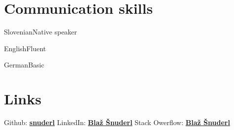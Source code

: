 \documentclass{tccv}
\begin{document}
\section{Communication skills}

\begin{factlist}
\item{Slovenian}{Native speaker}
\item{English}{Fluent}
\item{German}{Basic}
\end{factlist}

\section{Links} 
Github: \href{https://github.com/snuderl}{\textbf{snuderl}} \newline
LinkedIn:  \href{https://www.linkedin.com/pub/bla\%C5\%BE-\%C5\%A1nuderl/25/679/b84}{\textbf{Blaž Šnuderl}} \newline
Stack Owerflow: \href{http://stackoverflow.com/users/928489/bla\%C5\%BE-\%C5\%A1nuderl}{\textbf{Blaž Šnuderl}}
\end{document}
